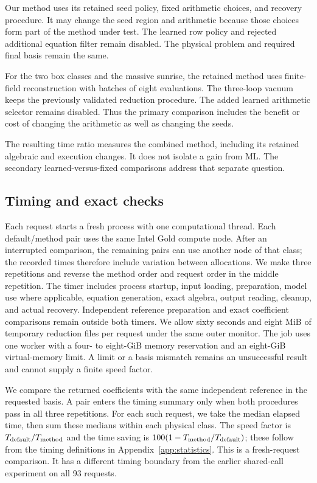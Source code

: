 Our method uses its retained seed policy, fixed arithmetic choices, and recovery procedure. It may change the seed region and arithmetic because those choices form part of the method under test. The learned row policy and rejected additional equation filter remain disabled. The physical problem and required final basis remain the same.

For the two box classes and the massive sunrise, the retained method uses finite-field reconstruction with batches of eight evaluations. The three-loop vacuum keeps the previously validated reduction procedure. The added learned arithmetic selector remains disabled. Thus the primary comparison includes the benefit or cost of changing the arithmetic as well as changing the seeds.

The resulting time ratio measures the combined method, including its retained algebraic and execution changes. It does not isolate a gain from ML. The secondary learned-versus-fixed comparisons address that separate question.

\subsection{Timing and exact checks}
Each request starts a fresh process with one computational thread. Each default/method pair uses the same Intel Gold compute node. After an interrupted comparison, the remaining pairs can use another node of that class; the recorded times therefore include variation between allocations. We make three repetitions and reverse the method order and request order in the middle repetition. The timer includes process startup, input loading, preparation, model use where applicable, equation generation, exact algebra, output reading, cleanup, and actual recovery. Independent reference preparation and exact coefficient comparisons remain outside both timers. We allow sixty seconds and eight MiB of temporary reduction files per request under the same outer monitor. The job uses one worker with a four- to eight-GiB memory reservation and an eight-GiB virtual-memory limit. A limit or a basis mismatch remains an unsuccessful result and cannot supply a finite speed factor.

We compare the returned coefficients with the same independent reference in the requested basis. A pair enters the timing summary only when both procedures pass in all three repetitions. For each such request, we take the median elapsed time, then sum these medians within each physical class. The speed factor is $T_{\rm default}/T_{\rm method}$ and the time saving is $100(1-T_{\rm method}/T_{\rm default})$; these follow from the timing definitions in Appendix~\ref{app:statistics}. This is a fresh-request comparison. It has a different timing boundary from the earlier shared-call experiment on all 93 requests.

